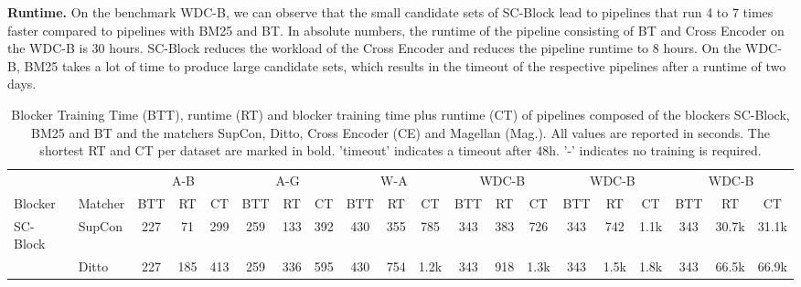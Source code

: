 \documentclass[sigconf,nonacm]{acmart}
\begin{document}
\vspace{.1cm}\noindent\textbf{Runtime.}
On the benchmark WDC-B, we can observe that the small candidate sets of SC-Block lead to pipelines that run 4 to 7 times faster compared to pipelines with BM25 and BT.
In absolute numbers, the runtime of the pipeline consisting of BT and Cross Encoder on the WDC-B is 30 hours. SC-Block reduces the workload of the Cross Encoder and reduces the pipeline runtime to 8 hours.
On the WDC-B, BM25 takes a lot of time to produce large candidate sets, which results in the timeout of the respective pipelines after a runtime of two days.


\begin{table*}[]
\setlength{\tabcolsep}{3.5pt}
\caption{Blocker Training Time (BTT), runtime (RT) and blocker training time plus runtime (CT) of pipelines composed of the blockers SC-Block, BM25 and BT and the matchers SupCon, Ditto, Cross Encoder (CE) and Magellan (Mag.). All values are reported in seconds. The shortest RT and CT per dataset are marked in bold. 'timeout' indicates a timeout after 48h. '-' indicates no training is required.}
\label{tab:run_time_training_time}
\begin{tabular}{@{}ll|ccc|ccc|ccc|ccc|ccc|ccc@{}}
\toprule
         &         & \multicolumn{3}{c}{A-B}                        & \multicolumn{3}{c}{A-G}                          & \multicolumn{3}{c}{W-A}  & \multicolumn{3}{c}{WDC-B}           & \multicolumn{3}{c}{WDC-B}  & \multicolumn{3}{c}{WDC-B}                         \\ 
Blocker  & Matcher & BTT & RT                         & CT                     & BTT & RT   & CT                      & BTT & RT                         & CT                       & BTT & RT                         & CT                      & BTT & RT                         & CT                      & BTT & RT                         & CT                      \\ \midrule
SC-Block             & SupCon   & 227                   & 71          & 299         & 259                   & 133         & 392          & 430                   & 355          & 785          & 343                   & 383          & 726          & 343                   & 742          & 1.1k         & 343 & 30.7k          & 31.1k          \\
                     & Ditto    & 227                   & 185         & 413         & 259                   & 336         & 595          & 430                   & 754          & 1.2k         & 343                   & 918          & 1.3k         & 343                   & 1.5k         & 1.8k         & 343 & 66.5k          & 66.9k          \\

\end{tabular}
\end{table*}
\end{document}
